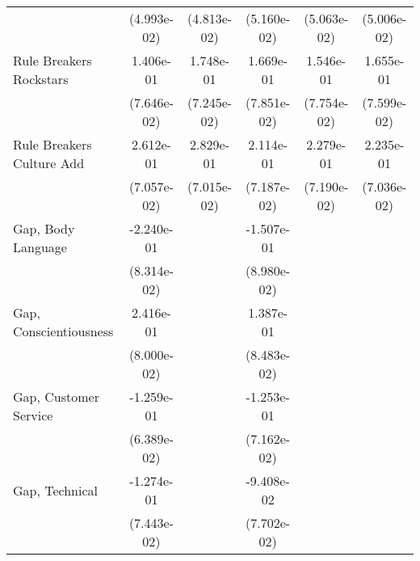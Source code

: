 {\begin{tabular}{l*{5}{c}}
                              & (4.993e-02)           & (4.813e-02)           & (5.160e-02)           & (5.063e-02)           & (5.006e-02)                 \\
    \addlinespace
    Rule Breakers Rockstars   & 1.406e-01\sym{+}      & 1.748e-01\sym{++}     & 1.669e-01\sym{++}     & 1.546e-01\sym{++}     & 1.655e-01\sym{++}           \\
                              & (7.646e-02)           & (7.245e-02)           & (7.851e-02)           & (7.754e-02)           & (7.599e-02)                 \\
    \addlinespace
    Rule Breakers Culture Add & 2.612e-01\sym{**}     & 2.829e-01\sym{**}     & 2.114e-01\sym{*}      & 2.279e-01\sym{*}      & 2.235e-01\sym{*}            \\
                              & (7.057e-02)           & (7.015e-02)           & (7.187e-02)           & (7.190e-02)           & (7.036e-02)                 \\
    \addlinespace
    Gap, Body Language        & -2.240e-01\sym{*}     &                       & -1.507e-01\sym{+}     &                       &                             \\
                              & (8.314e-02)           &                       & (8.980e-02)           &                       &                             \\
    \addlinespace
    Gap, Conscientiousness    & 2.416e-01\sym{*}      &                       & 1.387e-01             &                       &                             \\
                              & (8.000e-02)           &                       & (8.483e-02)           &                       &                             \\
    \addlinespace
    Gap, Customer Service     & -1.259e-01\sym{+}     &                       & -1.253e-01\sym{+}     &                       &                             \\
                              & (6.389e-02)           &                       & (7.162e-02)           &                       &                             \\
    \addlinespace
    Gap, Technical            & -1.274e-01\sym{+}     &                       & -9.408e-02            &                       &                             \\
                              & (7.443e-02)           &                       & (7.702e-02)           &                       &                             \\

\end{tabular}}
